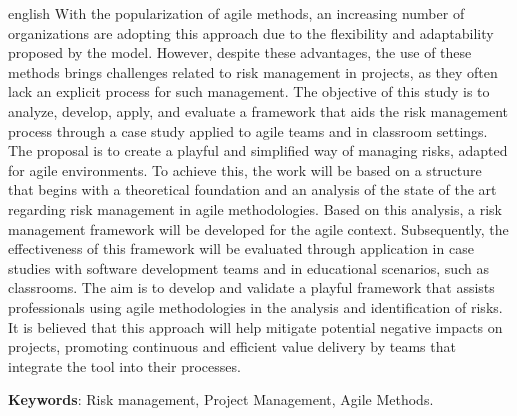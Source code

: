 \documentclass[
	12pt,
	openright,
	twoside,
	a4paper,
	english,
	brazil
	]{abntex2}
\begin{document}
\begin{resumo}[Abstract]
  \begin{otherlanguage*}{english}
    With the popularization of agile methods, an increasing number of organizations are adopting this approach due to the flexibility and adaptability proposed by the model. However, despite these advantages, the use of these methods brings challenges related to risk management in projects, as they often lack an explicit process for such management.
    The objective of this study is to analyze, develop, apply, and evaluate a framework that aids the risk management process through a case study applied to agile teams and in classroom settings. The proposal is to create a playful and simplified way of managing risks, adapted for agile environments.
    To achieve this, the work will be based on a structure that begins with a theoretical foundation and an analysis of the state of the art regarding risk management in agile methodologies. Based on this analysis, a risk management framework will be developed for the agile context. Subsequently, the effectiveness of this framework will be evaluated through application in case studies with software development teams and in educational scenarios, such as classrooms.
    The aim is to develop and validate a playful framework that assists professionals using agile methodologies in the analysis and identification of risks. It is believed that this approach will help mitigate potential negative impacts on projects, promoting continuous and efficient value delivery by teams that integrate the tool into their processes.
    \vspace{\onelineskip}

    \noindent\textbf{Keywords}: Risk management, Project Management, Agile Methods.
  \end{otherlanguage*}
\end{resumo}


\listoffigures*
\cleardoublepage




\listoftables*
\cleardoublepage
\end{document}
